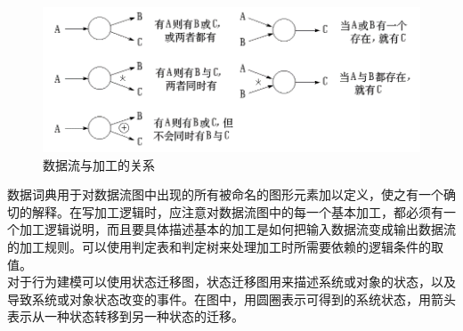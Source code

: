 \documentclass[chapter.computer_science.tex]{subfiles}
\begin{document}
\begin{figure}[H]
    \centering
    \includegraphics[scale=0.5]{./images/0036.png}
    \caption{数据流与加工的关系}
\end{figure}
数据词典用于对数据流图中出现的所有被命名的图形元素加以定义，使之有一个确切的解释。在写加工逻辑时，应注意对数据流图中的每一个基本加工，都必须有一个加工逻辑说明，而且要具体描述基本的加工是如何把输入数据流变成输出数据流的加工规则。可以使用判定表和判定树来处理加工时所需要依赖的逻辑条件的取值。\\
对于行为建模可以使用状态迁移图，状态迁移图用来描述系统或对象的状态，以及导致系统或对象状态改变的事件。在图中，用圆圈表示可得到的系统状态，用箭头表示从一种状态转移到另一种状态的迁移。
\end{document}
